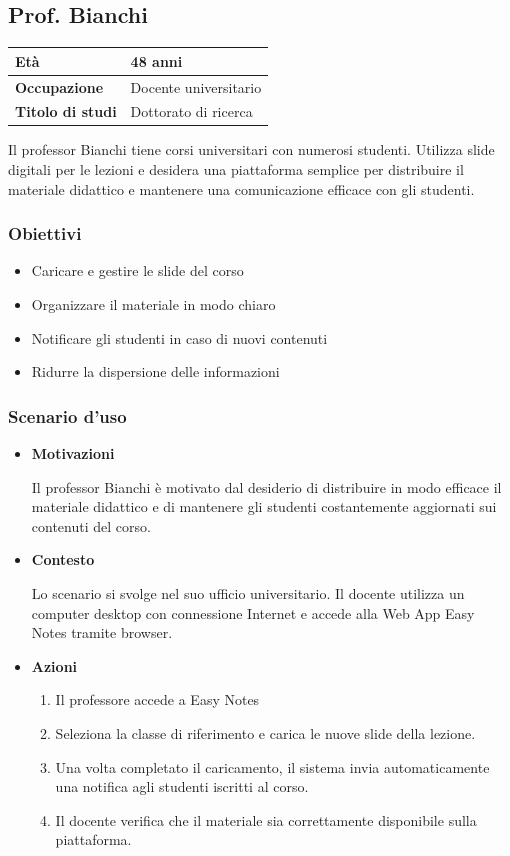 \subsection{Prof. Bianchi}
\begin{table}[h]
\centering
\begin{tabular}{|l|p{10cm}|}
\hline
\textbf{Età} & 48 anni \\
\hline
\textbf{Occupazione} & Docente universitario \\
\hline
\textbf{Titolo di studi} & Dottorato di ricerca \\
\hline
\end{tabular}
\end{table}

Il professor Bianchi tiene corsi universitari con numerosi studenti. Utilizza slide digitali per le lezioni e desidera una piattaforma semplice per distribuire il materiale didattico e mantenere una comunicazione efficace con gli studenti.

\subsubsection{Obiettivi}
\begin{itemize}
    \item Caricare e gestire le slide del corso
    \item Organizzare il materiale in modo chiaro
    \item Notificare gli studenti in caso di nuovi contenuti
    \item Ridurre la dispersione delle informazioni
\end{itemize}

\subsubsection{Scenario d'uso}
\begin{itemize}
    \item \textbf{Motivazioni}\par
    Il professor Bianchi è motivato dal desiderio di distribuire in modo efficace il materiale didattico e di mantenere gli studenti costantemente aggiornati sui contenuti del corso.
    \item \textbf{Contesto}\par
    Lo scenario si svolge nel suo ufficio universitario. Il docente utilizza un computer desktop con connessione Internet e accede alla Web App Easy Notes tramite browser.
    \item \textbf{Azioni}\par
    \begin{enumerate}
        \item Il professore accede a Easy Notes
        \item Seleziona la classe di riferimento e carica le nuove slide della lezione.
        \item Una volta completato il caricamento, il sistema invia automaticamente una notifica agli studenti iscritti al corso. 
        \item Il docente verifica che il materiale sia correttamente disponibile sulla piattaforma.
    \end{enumerate}
\end{itemize}